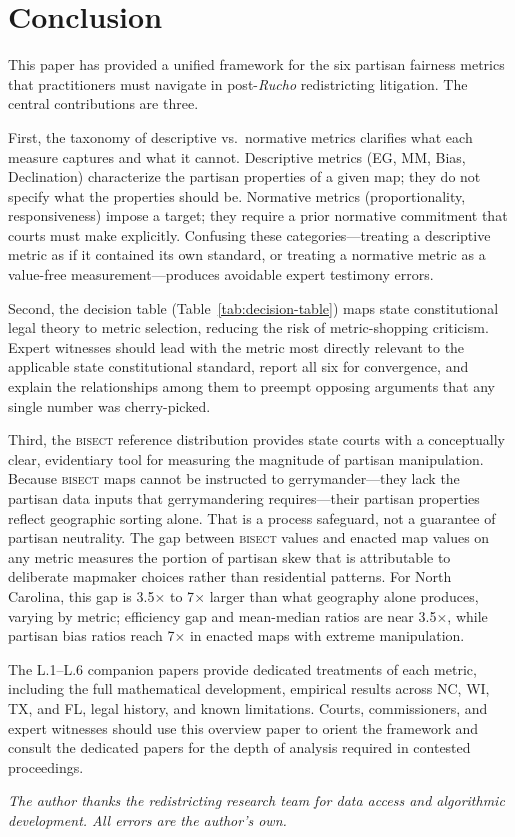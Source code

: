 \section{Conclusion}
\label{sec:conclusion}

This paper has provided a unified framework for the six partisan fairness metrics
that practitioners must navigate in post-\textit{Rucho} redistricting litigation.
The central contributions are three.

First, the taxonomy of descriptive vs.\ normative metrics clarifies what each
measure captures and what it cannot. Descriptive metrics (EG, MM, Bias, Declination)
characterize the partisan properties of a given map; they do not specify what the
properties should be. Normative metrics (proportionality, responsiveness) impose a
target; they require a prior normative commitment that courts must make explicitly.
Confusing these categories---treating a descriptive metric as if it contained its
own standard, or treating a normative metric as a value-free measurement---produces
avoidable expert testimony errors.

Second, the decision table (Table~\ref{tab:decision-table}) maps state constitutional
legal theory to metric selection, reducing the risk of metric-shopping criticism.
Expert witnesses should lead with the metric most directly relevant to the applicable
state constitutional standard, report all six for convergence, and explain the
relationships among them to preempt opposing arguments that any single number
was cherry-picked.

Third, the \textsc{bisect} reference distribution provides state courts with
a conceptually clear, evidentiary tool for measuring the magnitude of partisan
manipulation. Because \textsc{bisect} maps cannot be instructed to gerrymander---they lack the
partisan data inputs that gerrymandering requires---their partisan properties
reflect geographic sorting alone. That is a process safeguard, not a guarantee
of partisan neutrality. The gap between \textsc{bisect} values and enacted map
values on any metric measures the portion of partisan skew that is attributable
to deliberate mapmaker choices rather than residential patterns.
For North Carolina, this gap is 3.5$\times$ to 7$\times$ larger than what
geography alone produces, varying by metric; efficiency gap and mean-median
ratios are near 3.5$\times$, while partisan bias ratios reach 7$\times$ in
enacted maps with extreme manipulation.

The L.1--L.6 companion papers provide dedicated treatments of each metric,
including the full mathematical development, empirical results across NC, WI,
TX, and FL, legal history, and known limitations. Courts, commissioners, and
expert witnesses should use this overview paper to orient the framework and
consult the dedicated papers for the depth of analysis required in contested
proceedings.

\bigskip

\noindent\textit{The author thanks the redistricting research team for data
access and algorithmic development. All errors are the author's own.}
